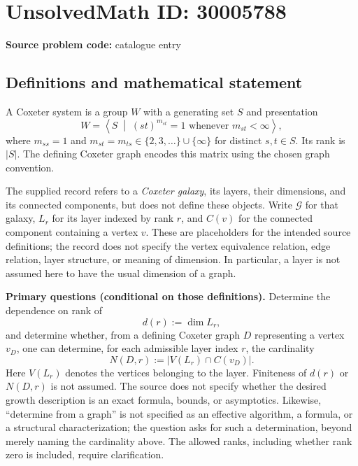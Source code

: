 \documentclass[11pt]{article}
\begin{document}
\section*{UnsolvedMath ID: 30005788}
\textbf{Source problem code:} catalogue entry
\subsection{Definitions and mathematical statement}
A Coxeter system is a group \(W\) with a generating set \(S\) and presentation
\[
W=\left\langle S\;\middle|\;(st)^{m_{st}}=1\text{ whenever }m_{st}<\infty\right\rangle,
\]
where \(m_{ss}=1\) and \(m_{st}=m_{ts}\in\{2,3,\ldots\}\cup\{\infty\}\) for distinct \(s,t\in S\). Its rank is \(|S|\). The defining Coxeter graph encodes this matrix using the chosen graph convention.

The supplied record refers to a \emph{Coxeter galaxy}, its layers, their dimensions, and its connected components, but does not define these objects. Write \(\mathcal G\) for that galaxy, \(L_r\) for its layer indexed by rank \(r\), and \(C(v)\) for the connected component containing a vertex \(v\). These are placeholders for the intended source definitions; the record does not specify the vertex equivalence relation, edge relation, layer structure, or meaning of dimension. In particular, a layer is not assumed here to have the usual dimension of a graph.

\textbf{Primary questions (conditional on those definitions).} Determine the dependence on rank of
\[
d(r):=\dim L_r,
\]
and determine whether, from a defining Coxeter graph \(D\) representing a vertex \(v_D\), one can determine, for each admissible layer index \(r\), the cardinality
\[
N(D,r):=\left|V(L_r)\cap C(v_D)\right|.
\]
Here \(V(L_r)\) denotes the vertices belonging to the layer. Finiteness of \(d(r)\) or \(N(D,r)\) is not assumed. The source does not specify whether the desired growth description is an exact formula, bounds, or asymptotics. Likewise, ``determine from a graph'' is not specified as an effective algorithm, a formula, or a structural characterization; the question asks for such a determination, beyond merely naming the cardinality above. The allowed ranks, including whether rank zero is included, require clarification.
\end{document}

